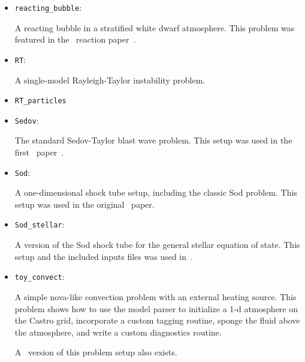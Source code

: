 \begin{itemize}
  
\item {\tt reacting\_bubble}:

  A reacting bubble in a stratified white dwarf atmosphere.  This
  problem was featured in the \maestro\ reaction
  paper~\cite{maestro:III}.

  
\item {\tt RT}:

  A single-model Rayleigh-Taylor instability problem.
  
  
\item {\tt RT\_particles}

\item {\tt Sedov}:

  The standard Sedov-Taylor blast wave problem.  This setup was used
  in the first \castro\ paper~\cite{castro_I}.
    
\item {\tt Sod}:
  
  A one-dimensional shock tube setup, including the classic Sod
  problem.  This setup was used in the original \castro\ paper.
  
\item {\tt Sod\_stellar}:

  A version of the Sod shock tube for the general stellar equation of
  state.  This setup and the included inputs files was used
  in~\cite{zingalekatz}.

  
\item {\tt toy\_convect}:

  A simple nova-like convection problem with an external heating
  source.  This problem shows how to use the model parser to
  initialize a 1-d atmosphere on the Castro grid, incorporate a custom
  tagging routine, sponge the fluid above the atmosphere, and write a
  custom diagnostics routine.

  A \maestro\ version of this problem setup also exists.
  
\end{itemize}
